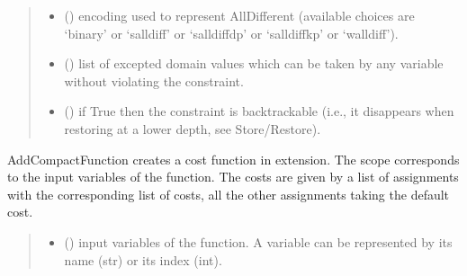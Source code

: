 \documentclass[letterpaper,10pt,openany,oneside,english]{sphinxmanual}
\begin{document}
\begin{fulllineitems}
\begin{fulllineitems}
\begin{quote}
\begin{description}
\begin{itemize}
\item {} 
\sphinxAtStartPar
{} () \textendash{} encoding used to represent AllDifferent (available choices are ‘binary’ or ‘salldiff’ or ‘salldiffdp’ or ‘salldiffkp’ or ‘walldiff’).

\item {} 
\sphinxAtStartPar
{} () \textendash{} list of excepted domain values which can be taken by any variable without violating the constraint.

\item {} 
\sphinxAtStartPar
{} () \textendash{} if True then the constraint is backtrackable (i.e., it disappears when restoring at a lower depth, see Store/Restore).

\end{itemize}

\end{description}\end{quote}

\end{fulllineitems}


\begin{fulllineitems}
\label{\detokenize{ref/ref_python:pytoulbar2.CFN.AddCompactFunction}}
\pysigstartsignatures
{}
\pysigstopsignatures
\sphinxAtStartPar
AddCompactFunction creates a cost function in extension. The scope corresponds to the input variables of the function.
The costs are given by a list of assignments with the corresponding list of costs, all the other assignments taking the default cost.
\begin{quote}\begin{description}
\begin{itemize}
\item {} 
\sphinxAtStartPar
{} () \textendash{} input variables of the function. A variable can be represented by its name (str) or its index (int).


\end{itemize}
\end{description}
\end{quote}
\end{fulllineitems}
\end{fulllineitems}
\end{document}
